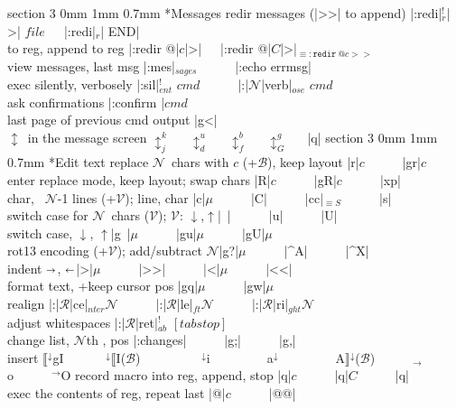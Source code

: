 \documentclass[10pt,a4paper,landscape]{article}
\makeatletter
\renewcommand{\section}{\@startsection		%
	{section}
	{3}
	{0mm}
	{1mm}
	{0.7mm}
	{\normalfont\bfseries\footnotesize}}
\newcommand{\toleft}{$\shortleftarrow$}
\newcommand{\toright}{$\shortrightarrow$}
\newcommand{\toend}{{\small\ForwardToEnd}}
\newcommand{\up}{$\uparrow$}
\newcommand{\down}{$\downarrow$}
\newcommand{\ibeg}{$\llbracket$}
\newcommand{\iend}{$\rrbracket$}
\newcommand{\eqv}[1]{$_{\equiv #1}$}
\newcommand{\opt}[1]{$_{#1}$}
\newcommand{\OPT}[2]{$_{#1}^{#2}$}
\newcommand{\after}[1]{#1$^\downarrow$}
\newcommand{\before}[1]{ $^\downarrow$#1}
\newcommand{\B}{{\footnotesize$\mathcal{B}$}}
\newcommand{\N}{{\footnotesize$\mathcal{N}$}}
\newcommand{\R}{{\footnotesize$\mathcal{R}$}}
\newcommand{\V}{{\footnotesize$\mathcal{V}$}}
\newcommand{\w}{{~~~}}
\newcommand{\next}{{\small\leftpointright}}
\newcommand{\prev}{{\small\rightpointleft}}
\makeatother
\begin{document}
\begin{multicols}{4}
{{\section*{Messages}
redir messages (|>>| to append)	    \dotfill|:redi|\OPT{r}{!}| >| $file$\w|:redi|\opt{r}| END|\\
to reg, append to reg		    \dotfill|:redir @|$c$|>|\w|:redir @|$C$|>|\eqv{\mathtt{:redir~@}c>>}\\
view messages, last msg		    \dotfill|:mes|\opt{sages}\w\w|:echo errmsg|\\
exec silently, verbosely	    \dotfill|:sil|\OPT{ent}{!} $cmd$\w\w|:|\N|verb|\opt{ose} $cmd$\\
ask confirmations		    \dotfill|:confirm |$cmd$\\
last page of previous cmd output    \dotfill|g<|\\
$\updownarrow$~in the message screen	     \dotfill$\updownarrow^k_j$\w$\updownarrow^u_d$\w$\updownarrow^b_f$\w$\updownarrow^g_G$\w|q|
\section*{Edit text}
replace \N~chars with $c$ (+\B), keep layout	\dotfill|r|$c$\w\w|gr|$c$\\
enter replace mode, keep layout; swap chars	\dotfill|R|$c$\w\w|gR|$c$\w\w|xp|\\
char, \toend~\N-1 lines (+\V); line, char	\dotfill|c|$\mu$\w\w|C|\w\w|cc|\eqv{S}\w\w|s|\\
switch case for \N~chars (\V); \V: \down,\up	\dotfill|~|\w\w|u|\w\w|U|\\
switch case, \down, \up				\dotfill|g~|$\mu$\w\w|gu|$\mu$\w\w|gU|$\mu$\\
rot13 encoding (+\V); add/subtract \N	\dotfill|g?|$\mu$\w\w|^A|\w\w|^X|\\
indent \toright, \toleft	    \dotfill|>|$\mu$\w\w|>>|\w\w|<|$\mu$\w\w|<<|\\
format text, +keep cursor pos	    \dotfill|gq|$\mu$\w\w|gw|$\mu$\\
realign				    \dotfill|:|\R|ce|\opt{nter}\N\w\w|:|\R|le|\opt{ft}\N\w\w|:|\R|ri|\opt{ght}\N\\
adjust whitespaces		    \dotfill|:|\R|ret|\OPT{ab}{!} $[tabstop]$\\
change list, {\N}th \prev, \next pos		    \dotfill|:changes|\w\w|g;|\w\w|g,|\\
insert \after{\ibeg}gI\w\w\before{\ibeg}I(\B)\w\w\w\before{i}\w\w\w\after{a}\w\w\w\after{A\iend}(\B)\w\w$_\rightarrow$o\w\w$^\rightarrow$O
record macro into reg, append, stop	\dotfill|q|$c$\w\w|q|$C$\w\w|q|\\
exec the contents of reg, repeat last	\dotfill|@|$c$\w\w|@@|
}}
\end{multicols}
\end{document}
